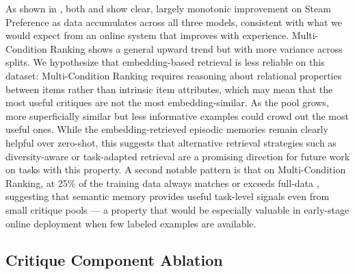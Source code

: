 As shown in , both \EPCRIT{} and \EPSEMCRIT{} show clear, largely monotonic improvement on Steam Preference as data accumulates across all three models, consistent with what we would expect from an online system that improves with experience. Multi-Condition Ranking shows a general upward trend but with more variance across splits. We hypothesize that embedding-based retrieval is less reliable on this dataset: Multi-Condition Ranking requires reasoning about relational properties between items rather than intrinsic item attributes, which may mean that the most useful critiques are not the most embedding-similar. As the pool grows, more superficially similar but less informative examples could crowd out the most useful ones. While the embedding-retrieved episodic memories remain clearly helpful over zero-shot, this suggests that alternative retrieval strategies such as diversity-aware or task-adapted retrieval are a promising direction for future work on tasks with this property. A second notable pattern is that on Multi-Condition Ranking, \EPSEMCRIT{} at 25\% of the training data always matches or exceeds full-data \EPCRIT{}, suggesting that semantic memory provides useful task-level signals even from small critique pools --- a property that would be especially valuable in early-stage online deployment when few labeled examples are available.

\subsection{Critique Component Ablation}

